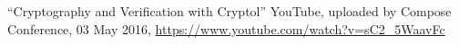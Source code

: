 \begin{thebibliography}{9}
	``Cryptography and Verification with Cryptol'' YouTube, uploaded by Compose Conference, 03 May 2016, \url{https://www.youtube.com/watch?v=sC2_5WaavFc}
\end{thebibliography} 